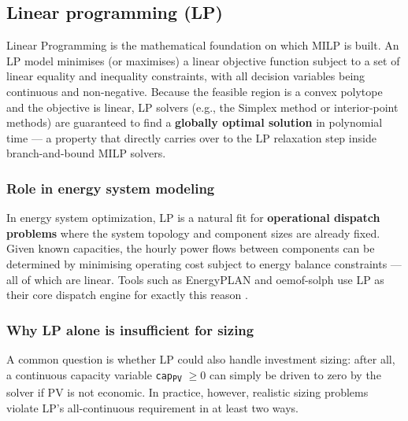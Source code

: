 \documentclass[11pt,a4paper]{report}
\begin{document}
\subsection{Linear programming (LP)}
\label{sub:lp}

Linear Programming is the mathematical foundation on which MILP is built.
An LP model minimises (or maximises) a linear objective function subject to a set of linear equality and inequality constraints, with all decision variables being continuous and non-negative.
Because the feasible region is a convex polytope and the objective is linear, LP solvers (e.g., the Simplex method or interior-point methods) are guaranteed to find a \textbf{globally optimal solution} in polynomial time --- a property that directly carries over to the LP relaxation step inside branch-and-bound MILP solvers.

\subsubsection*{Role in energy system modeling}

In energy system optimization, LP is a natural fit for \textbf{operational dispatch problems} where the system topology and component sizes are already fixed.
Given known capacities, the hourly power flows between components can be determined by minimising operating cost subject to energy balance constraints --- all of which are linear.
Tools such as EnergyPLAN and oemof-solph use LP as their core dispatch engine for exactly this reason \cite{Krien2020oemofsolph}.

\subsubsection*{Why LP alone is insufficient for sizing}

A common question is whether LP could also handle investment sizing: after all, a continuous capacity variable \texttt{cap\textsubscript{PV}} $\geq 0$ can simply be driven to zero by the solver if PV is not economic.
In practice, however, realistic sizing problems violate LP's all-continuous requirement in at least two ways.
\end{document}
